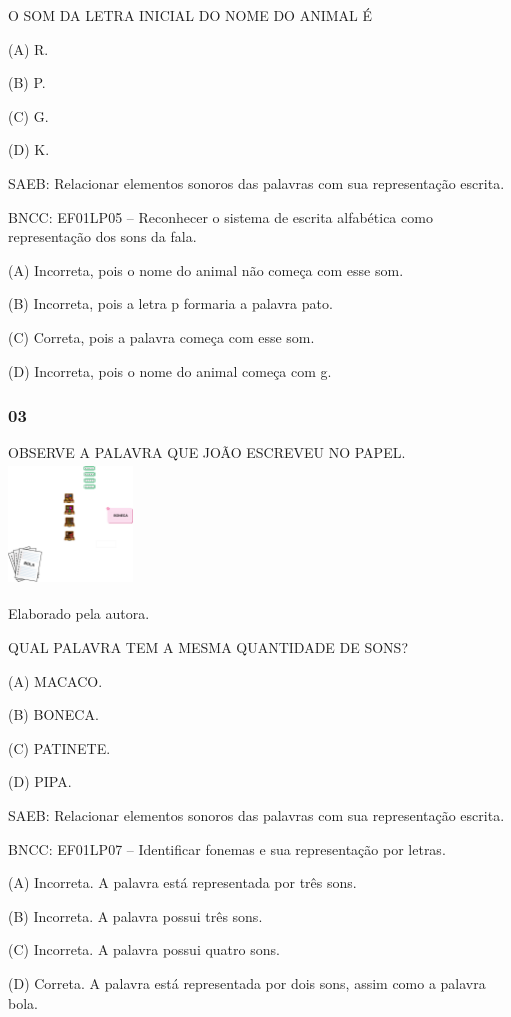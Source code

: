 O SOM DA LETRA INICIAL DO NOME DO ANIMAL É

(A) R.

(B) P.

(C) G.

(D) K.

SAEB: Relacionar elementos sonoros das palavras com sua
representação escrita.

BNCC: EF01LP05 -- Reconhecer o sistema de escrita alfabética como
representação dos sons da fala.

(A) Incorreta, pois o nome do animal não começa com esse som.

(B) Incorreta, pois a letra p formaria a palavra pato.

(C) Correta, pois a palavra começa com esse som.

(D) Incorreta, pois o nome do animal começa com g.

\subsubsection{03}\label{section-28}

OBSERVE A PALAVRA QUE JOÃO ESCREVEU NO
PAPEL.\includegraphics[width=1.29792in,height=1.27986in]{media/image188.png}

Elaborado pela autora.

QUAL PALAVRA TEM A MESMA QUANTIDADE DE SONS?

(A) MACACO.

(B) BONECA.

(C) PATINETE.

(D) PIPA.

SAEB: Relacionar elementos sonoros das palavras com sua
representação escrita.

BNCC: EF01LP07 -- Identificar fonemas e sua representação por
letras.

(A) Incorreta. A palavra está representada por três sons.

(B) Incorreta. A palavra possui três sons.

(C) Incorreta. A palavra possui quatro sons.

(D) Correta. A palavra está representada por dois sons, assim como a
palavra bola.

